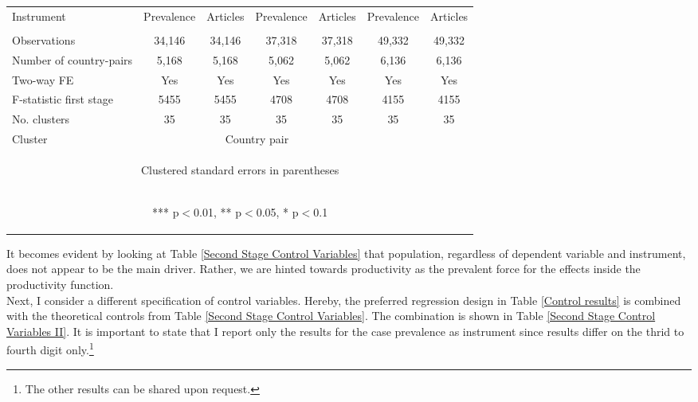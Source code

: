 \documentclass{article}
\begin{document}
\begin{table}[htbp]
{\begin{tabular}{lcccccc}
\vspace{4pt} Instrument & Prevalence & Articles & Prevalence & Articles & Prevalence & Articles \\ 
\vspace{4pt} & \begin{footnotesize}\end{footnotesize} & \begin{footnotesize}\end{footnotesize} & \begin{footnotesize}\end{footnotesize} & \begin{footnotesize}\end{footnotesize} \\ 
Observations & 34,146 & 34,146 & 37,318 & 37,318 & 49,332 & 49,332 \\
Number of country-pairs & 5,168 & 5,168 & 5,062 & 5,062 & 6,136 & 6,136 \\
Two-way FE & Yes & Yes & Yes & Yes & Yes & Yes \\
F-statistic first stage & 5455 & 5455 & 4708 & 4708 & 4155 & 4155 \\
No. clusters & 35 & 35 & 35 & 35 & 35 & 35 \\ 
Cluster & &\multicolumn{2}{c}{Country pair} \\ \hline
\multicolumn{7}{c}{\begin{footnotesize} Clustered standard errors in parentheses\end{footnotesize}} \\
\multicolumn{7}{c}{\begin{footnotesize} *** p$<$0.01, ** p$<$0.05, * p$<$0.1\end{footnotesize}} \\
\end{tabular}
}
\end{table}
It becomes evident by looking at Table \ref{Second Stage Control Variables} that population, regardless of dependent variable and instrument, does not appear to be the main driver. Rather, we are hinted towards productivity as the prevalent force for the effects inside the productivity function.\\
Next, I consider a different specification of control variables. Hereby, the preferred regression design in Table \ref{Control results} is combined with the theoretical controls from Table \ref{Second Stage Control Variables}. The combination is shown in Table \ref{Second Stage Control Variables II}. It is important to state that I report only the results for the case prevalence as instrument since results differ on the thrid to fourth digit only.\footnote{The other results can be shared upon request.}
\end{document}
